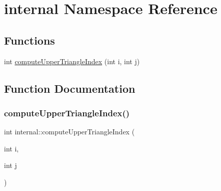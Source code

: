 \hypertarget{namespaceinternal}{}\section{internal Namespace Reference}
\label{namespaceinternal}
\subsection*{Functions}
\begin{DoxyCompactItemize}
\item 
int \mbox{\hyperlink{namespaceinternal_ab9dedffae2bb59029f803c731b9ce05d}{compute\+Upper\+Triangle\+Index}} (int i, int j)
\end{DoxyCompactItemize}


\subsection{Function Documentation}
\mbox{\label{namespaceinternal_ab9dedffae2bb59029f803c731b9ce05d}} 
\subsubsection{\texorpdfstring{compute\+Upper\+Triangle\+Index()}{computeUpperTriangleIndex()}}
{\footnotesize\ttfamily int internal\+::compute\+Upper\+Triangle\+Index (\begin{DoxyParamCaption}\item[{int}]{i,  }\item[{int}]{j }\end{DoxyParamCaption})\hspace{0.3cm}{\ttfamily [inline]}}

